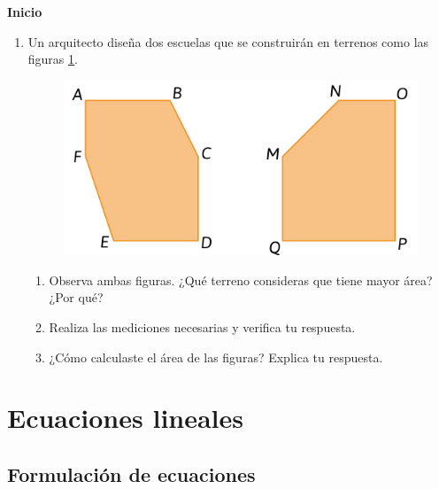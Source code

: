 \documentclass[11pt]{book}
\begin{document}
\begin{boxK}
  \begin{center}\textbf{Inicio}\end{center}

  \begin{enumerate}
    \item Un arquitecto diseña dos escuelas que se construirán en terrenos como las figuras \ref{fig:arqui}.
          \begin{figure}[H]
            \centering
            \includegraphics[width=.5\linewidth]{arqui.png}
            \label{fig:arqui}
          \end{figure}
          \begin{enumerate}
            \item Observa ambas figuras. ¿Qué terreno consideras que tiene mayor área? ¿Por qué?
            \item Realiza las mediciones necesarias y verifica tu respuesta.
            \item ¿Cómo calculaste el área de las figuras? Explica tu respuesta.
          \end{enumerate}
  \end{enumerate}
\end{boxK}















\newpage \thispagestyle{plain}
\section{Ecuaciones lineales}


\subsection{Formulación de ecuaciones}
\end{document}
